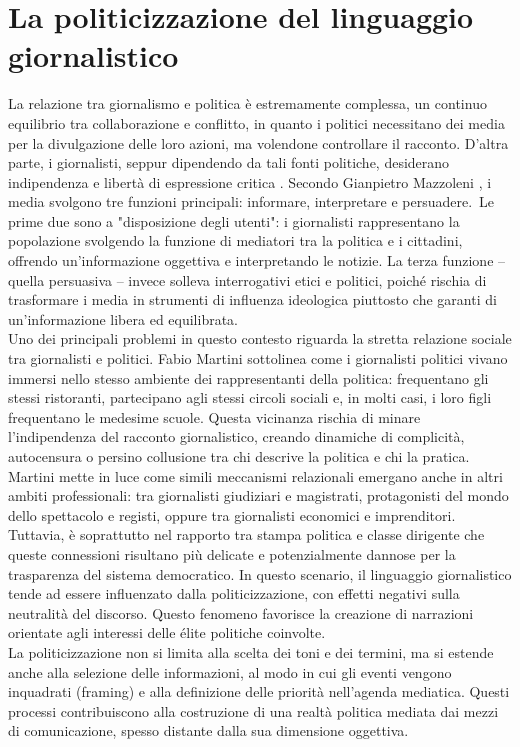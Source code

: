 \chapter{La politicizzazione del linguaggio giornalistico}

La relazione tra giornalismo e politica è estremamente complessa, un continuo equilibrio tra collaborazione e conflitto, in quanto i politici necessitano dei media per la divulgazione delle loro azioni, ma volendone controllare il racconto. D'altra parte, i giornalisti, seppur dipendendo da tali fonti politiche, desiderano indipendenza e libertà di espressione critica \cite{giornalismo&politica}. Secondo Gianpietro Mazzoleni \cite{gpMazzoleni}, i media svolgono tre funzioni principali: informare, interpretare e persuadere.\
Le prime due sono a "disposizione degli utenti": i giornalisti rappresentano la popolazione svolgendo la funzione di mediatori tra la politica e i cittadini, offrendo un'informazione oggettiva e interpretando le notizie. La terza funzione – quella persuasiva – invece solleva interrogativi etici e politici, poiché rischia di trasformare i media in strumenti di influenza ideologica piuttosto che garanti di un'informazione libera ed equilibrata. \\
Uno dei principali problemi in questo contesto riguarda la stretta relazione sociale tra giornalisti e politici. Fabio Martini \cite{fMartini} sottolinea come i giornalisti politici vivano immersi nello stesso ambiente dei rappresentanti della politica: frequentano gli stessi ristoranti, partecipano agli stessi circoli sociali e, in molti casi, i loro figli frequentano le medesime scuole. Questa vicinanza rischia di minare l’indipendenza del racconto giornalistico, creando dinamiche di complicità, autocensura o persino collusione tra chi descrive la politica e chi la pratica. \\
Martini mette in luce come simili meccanismi relazionali emergano anche in altri ambiti professionali: tra giornalisti giudiziari e magistrati, protagonisti del mondo dello spettacolo e registi, oppure tra giornalisti economici e imprenditori. Tuttavia, è soprattutto nel rapporto tra stampa politica e classe dirigente che queste connessioni risultano più delicate e potenzialmente dannose per la trasparenza del sistema democratico. In questo scenario, il linguaggio giornalistico tende ad essere influenzato dalla politicizzazione, con effetti negativi sulla neutralità del discorso. Questo fenomeno favorisce la creazione di narrazioni orientate agli interessi delle élite politiche coinvolte. \\
La politicizzazione non si limita alla scelta dei toni e dei termini, ma si estende anche alla selezione delle informazioni, al modo in cui gli eventi vengono inquadrati (\gls{framing}) e alla definizione delle priorità nell’agenda mediatica. Questi processi contribuiscono alla costruzione di una realtà politica mediata dai mezzi di comunicazione, spesso distante dalla sua dimensione oggettiva. \\

